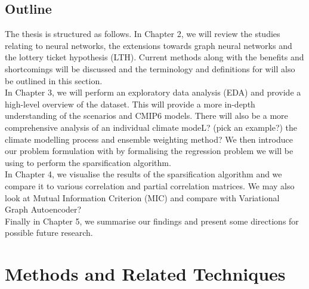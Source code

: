 \documentclass[honours,12pt]{unswthesis}
\numberwithin{equation}{section}
\begin{document}
{\section{Outline}}\label{outline}

{\noindent}The thesis is structured as follows. 
In Chapter 2, we will review the studies relating to neural networks, the extensions towards graph neural networks and the lottery ticket hypothesis (LTH).
Current methods along with the benefits and shortcomings will be discussed and the terminology and definitions for will also be outlined in this section. \\

{\noindent}In Chapter 3, we will perform an exploratory data analysis (EDA) and provide a high-level overview of the dataset. This will provide a more
in-depth understanding of the scenarios and CMIP6 models. There will also be a more comprehensive analysis of an individual climate modeL? (pick an example?)
the climate modelling process and ensemble weighting method? We then introduce our problem formulation with by formalising the regression problem we will be using
to perform the sparsification algorithm. \\

{\noindent}In Chapter 4, we visualise the results of the sparsification algorithm and we compare it to various correlation and partial correlation matrices. 
We may also look at Mutual Information Criterion (MIC) and compare with Variational Graph Autoencoder? \\

{\noindent}Finally in Chapter 5, we summarise our findings and present some directions for possible future research.



\chapter{Methods and Related Techniques}




\end{document}

